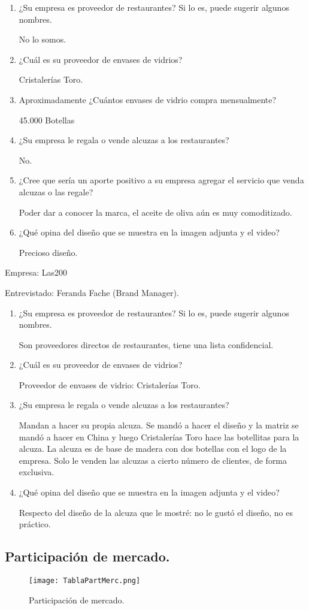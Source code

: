 \begin{enumerate}
\item ¿Su empresa es proveedor de restaurantes? Si lo es, puede sugerir algunos nombres.

No lo somos.

\item ¿Cuál es su proveedor de envases de vidrios?

Cristalerías Toro.

 \item Aproximadamente ¿Cuántos envases de vidrio compra mensualmente?

45.000 Botellas

 \item ¿Su empresa le regala o vende alcuzas a los restaurantes?

No.

\item ¿Cree que sería un aporte positivo a su empresa agregar el servicio que venda alcuzas o las regale?

 Poder dar a conocer la marca, el aceite de oliva aún es muy comoditizado.

\item ¿Qué opina del diseño que se muestra en la imagen adjunta y el video?

 Precioso diseño.

\end{enumerate}

Empresa: Las200

Entrevistado: Feranda Fache (Brand Manager).

\begin{enumerate}
\item ¿Su empresa es proveedor de restaurantes? Si lo es, puede sugerir algunos nombres.

Son proveedores directos de restaurantes, tiene una lista confidencial.

\item ¿Cuál es su proveedor de envases de vidrios?

Proveedor de envases de vidrio: Cristalerías Toro.

\item ¿Su empresa le regala o vende alcuzas a los restaurantes?

Mandan a hacer su propia alcuza. Se mandó a hacer el diseño y la matriz se mandó a hacer en China y luego Cristalerías Toro hace las botellitas para la alcuza. La alcuza es de base de madera con dos botellas con el logo de la empresa. Solo le venden las alcuzas a cierto número de clientes, de forma exclusiva.

\item ¿Qué opina del diseño que se muestra en la imagen adjunta y el video?

Respecto del diseño de la alcuza que le mostré: no le gustó el diseño, no es práctico.
\end{enumerate}

\newpage
\subsection{Participación de mercado.}
 \label{PartMerc}
  \begin{figure}[H]
    \label{TablaPartMerc}
    \centering
    \texttt{[image: TablaPartMerc.png]}
    \caption{Participación de mercado.}
  \end{figure}
